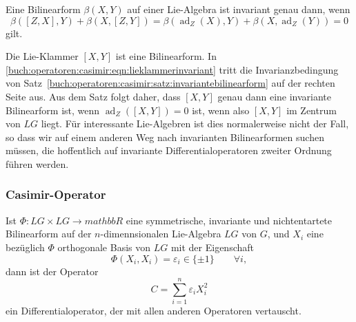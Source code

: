 \begin{satz}
\label{buch:operatoren:casimir:satz:invariantebilinearform}
Eine Bilinearform $\beta(X,Y)$ auf einer Lie-Algebra ist invariant
genau dann, wenn
\[
\beta([Z,X],Y) + \beta(X,[Z,Y])
=
\beta(\operatorname{ad}_Z(X),Y)
+
\beta(X,\operatorname{ad}_Z(Y))
=
0
\]
gilt.
\end{satz}

Die Lie-Klammer $[X,Y]$ ist eine Bilinearform.
In \eqref{buch:operatoren:casimir:eqn:lieklammerinvariant} tritt
die Invarianzbedingung von
Satz~\ref{buch:operatoren:casimir:satz:invariantebilinearform}
auf der rechten Seite aus.
Aus dem Satz folgt daher, dass $[X,Y]$ genau dann eine invariante
Bilinearform ist, wenn $\operatorname{ad}_Z([X,Y])=0$ ist, wenn also
$[X,Y]$ im Zentrum von $LG$ liegt.
Für interessante Lie-Algebren ist dies normalerweise nicht der Fall,
so dass wir auf einem anderen Weg nach invarianten Bilinearformen
suchen müssen, die hoffentlich auf invariante Differentialoperatoren
zweiter Ordnung führen werden.

%
%
\subsubsection{Casimir-Operator}

\begin{satz}
Ist $\Phi\colon LG\times LG\to mathbb{R}$ eine symmetrische, invariante
und nichtentartete Bilinearform auf der $n$-dimennsionalen Lie-Algebra
$LG$ von $G$, und $X_i$ eine bezüglich $\Phi$
orthogonale Basis von $LG$ mit der Eigenschaft
\[
\Phi(X_i,X_i) = \varepsilon_i \in \{\pm 1\}\qquad\forall i,
\]
dann ist der Operator
\[
C
=
\sum_{i=1}^n \varepsilon_i X_i^2
\]
ein Differentialoperator, der mit allen anderen Operatoren vertauscht.
\end{satz}


